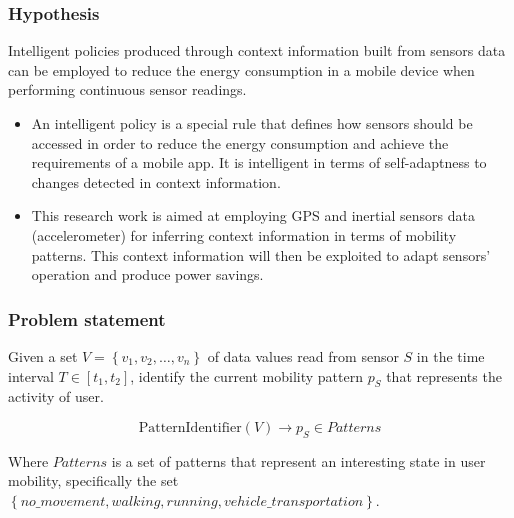 \documentclass[compress,9pt,xcolor={dvipsnames,table}]{beamer}
\begin{document}
\begin{frame}\frametitle{Hypothesis}
\begin{tcolorbox}[title=Hypothesis,colframe=PineGreen]
Intelligent policies produced through context information built from sensors data can be employed to reduce the energy consumption in a mobile device when performing continuous sensor readings.
\end{tcolorbox}

{
\small
\begin{itemize}
  \item An intelligent policy is a special rule that defines how sensors should be accessed in order to reduce the energy consumption and achieve the requirements of a mobile app.
  It is intelligent in terms of self-adaptness to changes detected in context information.
  \item This research work is aimed at employing GPS and inertial sensors data (accelerometer) for inferring context information in terms of mobility patterns.
  This context information will then be exploited to adapt sensors' operation and produce power savings.
\end{itemize}
}
\end{frame}

\begin{frame}\frametitle{Problem statement}
\begin{tcolorbox}[title=Problem statement: Mobility pattern identification,colframe=PineGreen]
\small
Given a set $V = \left\{v_{1}, v_{2}, \dotsc, v_{n}\right\}$ of data values read from sensor $S$ in the time interval $T  \in [t_{1}, t_{2}]$, identify the current mobility pattern $p_{S}$ that represents the activity of user.

\begin{equation}
  \text{PatternIdentifier}( V ) \longrightarrow{} p_{S} \in Patterns
\end{equation}

Where $Patterns$ is a set of patterns that represent an interesting state in user mobility, specifically the set $\left\{no\_movement, walking, running, vehicle\_transportation\right\}$.
\end{tcolorbox}
\end{frame}
\end{document}
